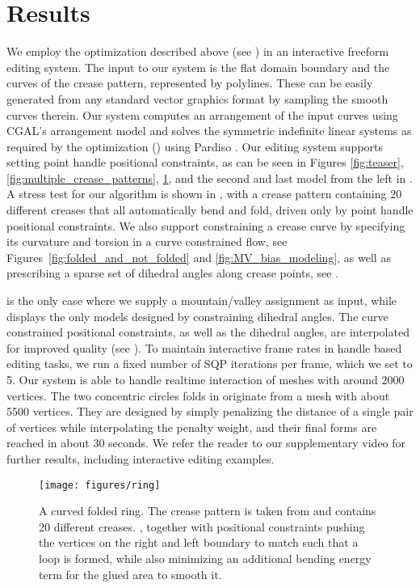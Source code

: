 \section{Results} \label{sec:results}

We employ the optimization described above (see ) in an interactive freeform editing system. The input to our system is the flat domain boundary and the curves of the crease pattern, represented by polylines. These can be easily generated from any standard vector graphics format by sampling the smooth curves therein. Our system computes an arrangement of the input curves using CGAL's arrangement model \cite{cgal,cgal_arr1,cgal_arr2} and solves the symmetric indefinite  linear systems as required by the optimization () using Pardiso \cite{PARDISO1,PARDISO2,PARDISO3}. Our editing system supports setting point handle positional constraints, as can be seen in Figures \ref{fig:teaser}, \ref{fig:multiple_crease_patterns}, \ref{fig:ring}, and the second and last model from the left in . A stress test for our algorithm is shown in , with a crease pattern containing $20$ different creases that all automatically bend and fold, driven only by point handle positional constraints. We also support  constraining a crease curve by specifying its curvature and torsion in a curve constrained flow,  see Figures~\ref{fig:folded_and_not_folded} and \ref{fig:MV_bias_modeling}, as well as prescribing a sparse set of dihedral angles along crease points, see . 

 is the only case where we supply a mountain/valley assignment as input, while  displays the only models designed by constraining dihedral angles. The curve constrained positional constraints, as well as the dihedral angles, are interpolated for improved quality (see ). To maintain interactive frame rates in handle based editing tasks, we run a fixed number of SQP iterations per frame, which we set to 5. Our system is able to handle realtime interaction of meshes with around 2000 vertices. The two concentric circles folds in  originate from a mesh with about 5500 vertices. They are designed by simply penalizing the distance of a single pair of vertices while interpolating the penalty weight, and their final forms are reached in about 30 seconds. We refer the reader to our supplementary video for further results, including interactive editing examples. 

\begin{figure} [t]
	\centering
	\texttt{[image: figures/ring]}
	\caption{A curved folded ring. The crease pattern is taken from \cite{mitani2019curved} and contains 20 different creases. , together with positional constraints pushing the vertices on the right and left boundary to match such that a loop is formed, while also minimizing an additional bending energy term for the glued area to smooth it.}
	\label{fig:ring}
\end{figure}